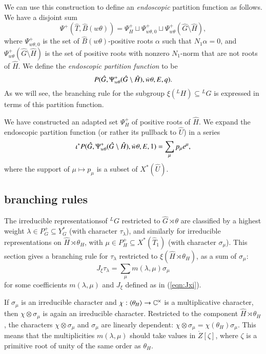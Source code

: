 We can use this construction to define an {\it endoscopic} partition
function as follows.  
We have a disjoint sum
\begin{equation}\label{eqn:disj-b1}
\Psi^+(\hat T,\hat B(w\theta)) = 
\Psi^+_H \sqcup \Psi_{w\theta,0}^+ 
\sqcup \Psi_{w\theta}^+(\hat G\setminus\hat H),
\end{equation}
where $\Psi_{w\theta,0}^+$ is the set of $\hat B(w\theta)$-positive
roots $\alpha$ such that $N_1\alpha=0$, and $\Psi_{w\theta}^+(\hat
G\setminus\hat H)$ is the set of positive roots with nonzero
$N_1$-norm that are not roots of $\hat H$.  We define the {\it
  endoscopic partition function} to be
\begin{equation}\label{eqn:endo-partition}
P(\hat G,\Psi_{w\theta}^+(\hat G\setminus\hat H),\dot w\theta,E,q).
\end{equation}
As we will see, the branching rule for the subgroup
$\xi({}^LH)\subseteq {}^LG$ is expressed in terms of this partition
function.

We have constructed an adapted set $\Psi^+_H$ of positive roots of
$\hat H$.  We expand the endoscopic partition function (or rather its
pullback to $\hat U$) in a series
\begin{equation}
\iota^* P(\hat G,\Psi_{w\theta}^+
(\hat G\setminus\hat H),\dot w\theta,E,1) = \sum_{\mu} p_\mu e^\mu,
\end{equation}
where the support of $\mu\mapsto p_\mu$ is a subset of $X^*(\hat U)$.

\subsection{branching rules}

The irreducible representationsof ${}^LG$ restricted
to $\hat G\rtimes\theta$ are classified by a highest weight
$\lambda\in P^+_G\subseteq Y^*_G$ (with character  $\tau_\lambda$), and similarly for irreducible
representations on $\hat H\rtimes \theta_H$, with $\mu\in
P^+_H\subseteq X^*(\hat T_1)$ (with character $\sigma_\mu$).  This section gives a branching rule
for $\tau_\lambda$ restricted to $\xi(\hat H\rtimes\theta_H)$, as a
sum of $\sigma_\mu$:
\[
J_\xi\tau_\lambda = \sum_\mu m(\lambda,\mu) \sigma_\mu
\]
for some coefficients $m(\lambda,\mu)$ and $J_\xi$ defined as in (\ref{eqn:Jxi}).  

If $\sigma_\mu$ is an irreducible character and
$\chi:\langle{\theta_H}\rangle\to \mathbb{C}^\times$ is a multiplicative
character, then $ \chi\otimes\sigma_\mu$ is again an irreducible
character.  Restricted to the component $\hat H\rtimes\theta_H$, the characters
$\chi\otimes\sigma_\mu$ and $\sigma_\mu$ are linearly dependent:
$\chi\otimes\sigma_\mu = \chi(\theta_H) \sigma_\mu $.  This means that
the multiplicities $m(\lambda,\mu)$ should take values in
$\ring{Z}[\zeta]$, where $\zeta$ is a primitive root of unity of the
same order as $\theta_H$.

